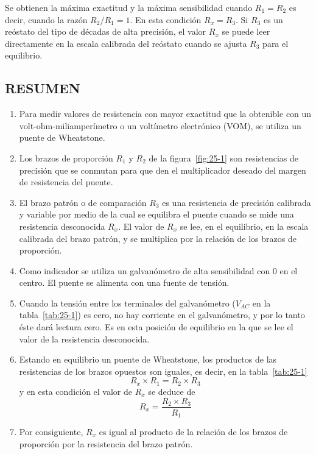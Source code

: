 \documentclass{article}
\numberwithin{equation}{subsection}
\numberwithin{figure}{section}
\numberwithin{table}{section}
\begin{document}
Se obtienen la máxima exactitud y la máxima sensibilidad cuando $R_1 = R_2$ es decir, cuando la razón 
$R_2/R_1 = 1$. En esta condición $R_x = R_3$. Si $R_3$ es un reóstato del tipo de décadas de alta precisión, 
el valor $R_x$ se puede leer directamente en la escala calibrada del reóstato cuando se ajusta $R_3$ para 
el equilibrio.

\subsection{RESUMEN}
\begin{enumerate}
    \item Para medir valores de resistencia con mayor exactitud que la obtenible con un volt-ohm-miliamperímetro 
    o un voltímetro electrónico (VOM), se utiliza un puente de Wheatstone.
    \item Los brazos de proporción $R_1$ y $R_2$ de la figura~\ref{fig:25-1} son resistencias de precisión que se 
    conmutan para que den el multiplicador deseado del margen de resistencia del puente.
    \item El brazo patrón o de comparación $R_3$ es una resistencia de precisión calibrada y variable por medio de 
    la cual se equilibra el puente cuando se mide una resistencia desconocida $R_x$. El valor de $R_x$ se lee, en 
    el equilibrio, en la escala calibrada del brazo patrón, y se multiplica por la relación de los brazos 
    de proporción.
    \item Como indicador se utiliza un galvanómetro de alta sensibilidad con 0 en el centro. El puente se alimenta 
    con una fuente de tensión.
    \item Cuando la tensión entre los terminales del galvanómetro ($V_{AC}$ en la tabla~\ref{tab:25-1}) es cero, no 
    hay corriente en el galvanómetro, y por lo tanto éste dará lectura cero. Es en esta posición de equilibrio en 
    la que se lee el valor de la resistencia desconocida.
    \item Estando en equilibrio un puente de Wheatstone, los productos de las resistencias de los brazos opuestos son 
    iguales, es decir, en la tabla~\ref{tab:25-1}
    \begin{equation} R_x \times R_1 = R_2 \times R_3 \label{eq:resumen_1} \end{equation}
    y en esta condición el valor de $R_x$ se deduce de
    \begin{equation} R_x = \frac{R_2 \times R_3}{R_1} \label{eq:resumen_2} \end{equation}
    \item Por consiguiente, $R_x$ es igual al producto de la relación de los brazos de proporción por la resistencia 
    del brazo patrón.
\end{enumerate}
\end{document}
